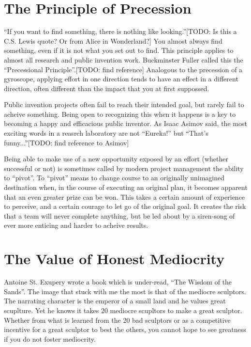\documentclass[
	fontsize=10pt, %
	twoside=false, %
	secnumdepth=1, %
]{kaobook}
\begin{document}
\section{The Principle of Precession}

``If you want to find something, there is nothing like looking.''[TODO: Is this a C.S. Lewis quote? Or from Alice in Wonderland?]
You almost always find something, even if it is not what you set out to find.
This principle applies to almost all research and public invention work.
Buckminster Fuller called this the ``Precessional Principle''.[TODO: find reference]
Analogous to the precession of a gyroscope, applying effort in
one direction tends to have an effect in a different direction,
often different than the impact that you at first suppossed.

Public invention projects often fail to reach their intended goal,
but rarely fail to acheive something.
Being open to recognizing this when it happens is a key to
becoming a happy and efficacious public inventor.
As Isaac Asimov said, the most exciting words in a
reasrch laboratory are not ``Eureka!'' but ``That's funny...''[TODO: find reference to Asimov]

Being able to make use of a new opportunity exposed by
an effort (whether successful or not) is sometimes called
by modern project management the ability to ``pivot''.
To ``pivot'' means to change course to an originally
unimagined destination when, in the course of executing
an original plan, it becomes apparent that an even greater
prize can be won. This takes a certain amount of experience
to perceive, and a certain courage to let go of the original goal.
It creates the risk that a team will never complete anything,
but be led about by a siren-song of ever more enticing and
harder to acheive results.

\section{The Value of Honest Mediocrity}

Antoine St. Exupery wrote a book which is under-read,
``The Wisdom of the Sands''.
The image that stuck with me the most is
that of the mediocre sculptors.
The narrating character is the emperor of a small land
and he values great scuplture.
Yet he knows it takes 20 mediocre scupltors to make
a great sculptor. Whether from what is learned
from the 20 bad sculptors or as a competitive incentive for a
great sculptor to best the others, you cannot
hope to see greatness if you do not foster mediocrity.
\end{document}
